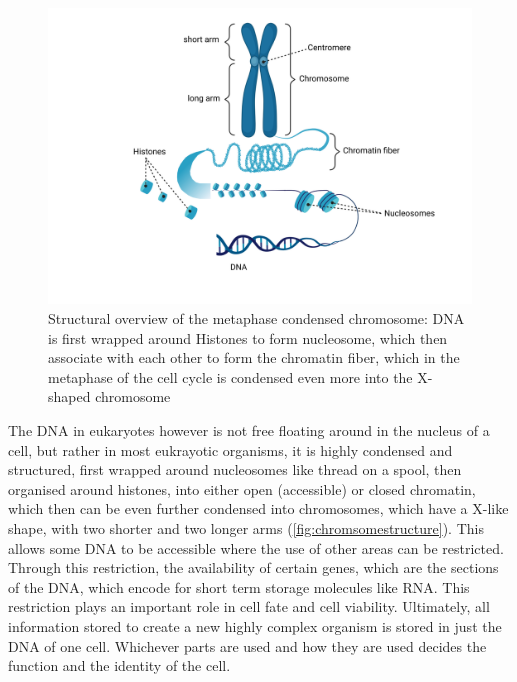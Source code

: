 \begin{figure}[!ht]
\centering
\includegraphics[width=0.9\linewidth]{Figures/intro/ChromosomeStructure}
\caption[Overview Chromosome structure]{Structural overview of the metaphase condensed chromosome: DNA is first wrapped around Histones to form nucleosome, which then associate with each other to form the chromatin fiber, which in the metaphase of the cell cycle is condensed even more into the X-shaped chromosome}\label{fig:chromsomestructure}
\end{figure}

The DNA in eukaryotes however is not free floating around in the nucleus of a cell, but rather in most eukrayotic organisms, it is highly condensed and structured, first wrapped around nucleosomes like thread on a spool, then organised around histones, into either open (accessible) or closed chromatin, which then can be even further condensed into chromosomes, which have a X-like shape, with two shorter and two longer arms (\autoref{fig:chromsomestructure}). This allows some DNA to be accessible where the use of other areas can be restricted\cite{Hammond2017}. Through this restriction, the availability of certain genes, which are the sections of the DNA, which encode for short term storage molecules like RNA. This restriction plays an important role in cell fate and cell viability. Ultimately, all information stored to create a new highly complex organism is stored in just the DNA of one cell. Whichever parts are used and how they are used decides the function and the identity of the cell\cite{Bonev2016}. 



